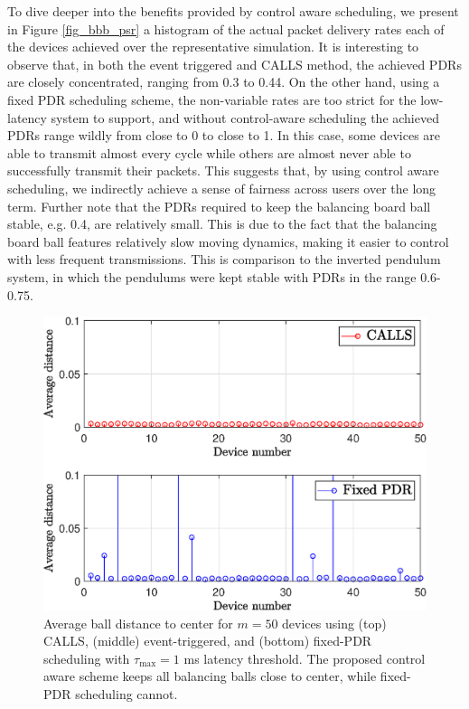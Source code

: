 { To dive deeper into the benefits provided by control aware scheduling, we present in Figure \ref{fig_bbb_psr} a histogram of the actual  packet delivery rates each of the devices achieved over the representative simulation. It is interesting to observe that, in both the event triggered and CALLS method, the achieved PDRs are closely concentrated, ranging from 0.3 to 0.44. On the other hand, using a fixed PDR scheduling scheme, the non-variable rates are too strict for the low-latency system to support, and without control-aware scheduling the achieved PDRs range wildly from close to 0 to close to 1. In this case, some devices are able to transmit almost every cycle while others are almost never able to successfully transmit their packets. This suggests that, by using control aware scheduling, we indirectly achieve a sense of fairness across users over the long term. Further note that the PDRs required to keep the balancing board ball stable, e.g. 0.4, are relatively small. This is due to the fact that the balancing board ball features relatively slow moving dynamics, making it easier to control with less frequent transmissions. This is comparison to the inverted pendulum system, in which the pendulums were kept stable with PDRs in the range 0.6-0.75.
 }

\begin{figure}
\centering
\includegraphics[width=.45\textwidth]{../images/bbb_dist.eps}
\caption{Average ball distance to center for $m=50$ devices using (top) CALLS, (middle) event-triggered, and (bottom) fixed-PDR scheduling with $\tau_{\max} =1$ ms latency threshold. The proposed control aware scheme keeps all balancing balls close to center, while fixed-PDR scheduling cannot.}
\label{fig_bbb_dist}
\end{figure}

